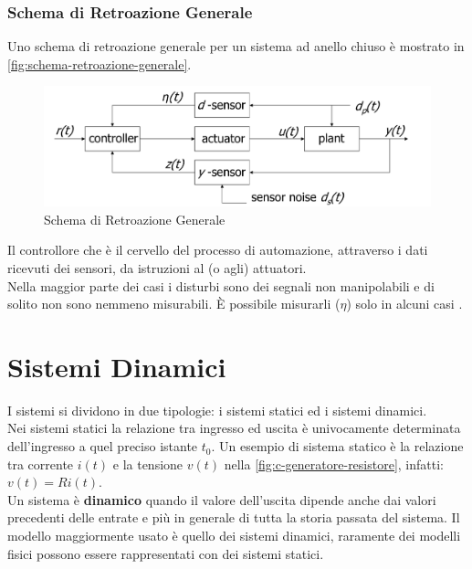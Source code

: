 \documentclass[12pt]{article}
\begin{document}
\subsubsection{Schema di Retroazione Generale}\label{sec:schema-di-retroazione-generale}
Uno schema di retroazione generale per un sistema ad anello chiuso \`e mostrato in \autoref{fig:schema-retroazione-generale}.
\begin{figure}[H]
    \centering
    \includegraphics[scale=0.3]{schema-retroazione-generale.png}
    \caption{Schema di Retroazione Generale}
    \label{fig:schema-retroazione-generale}
\end{figure}

Il controllore che \`e il cervello del processo di automazione, attraverso i dati ricevuti dei sensori, da istruzioni al (o agli) attuatori. \\
Nella maggior parte dei casi i disturbi sono dei segnali non manipolabili e di solito non sono nemmeno misurabili. \`E possibile misurarli ($\eta$) solo in alcuni casi .


\newpage
\section{Sistemi Dinamici}\label{sec:sistemi-dinamici}
I sistemi si dividono in due tipologie: i sistemi statici ed i sistemi dinamici. \\
Nei sistemi statici la relazione tra ingresso ed uscita \`e univocamente determinata dell'ingresso a quel preciso istante $t_0$.
Un esempio di sistema statico \`e la relazione tra corrente $i(t)$ e la tensione $v(t)$ nella \autoref{fig:c-generatore-resistore}, infatti: $v(t) = Ri(t)$. \\
Un sistema \`e \textbf{dinamico} quando il valore dell'uscita dipende anche dai valori precedenti delle entrate e pi\`u in generale di tutta la storia passata del sistema.
Il modello maggiormente usato \`e quello dei sistemi dinamici, raramente dei modelli fisici possono essere rappresentati con dei sistemi statici.
\end{document}
